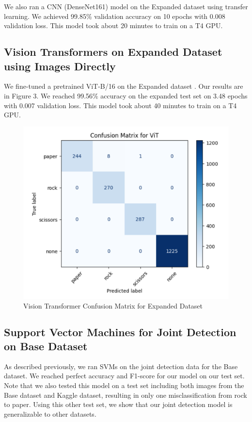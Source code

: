 \documentclass{article}
\begin{document}
We also ran a CNN (DenseNet161) model on the Expanded dataset using transfer learning. We achieved 99.85\% validation accuracy on 10 epochs with 0.008 validation loss. This model took about 20 minutes to train on a T4 GPU.

\subsection{Vision Transformers on Expanded Dataset using Images Directly}

We fine-tuned a pretrained ViT-B/16 on the Expanded dataset \cite{vit}. Our results are in Figure 3. We reached 99.56\% accuracy on the expanded test set on 3.48 epochs with 0.007 validation loss. This model took about 40 minutes to train on a T4 GPU.

\begin{figure}[h]
\begin{center}
\centerline{\includegraphics[width=\columnwidth]{vision_confus.png}}
\caption{Vision Transformer Confusion Matrix for Expanded Dataset}
\end{center}
\vskip -0.1in
\end{figure}

\subsection{Support Vector Machines for Joint Detection on Base Dataset}
As described previously, we ran SVMs on the joint detection data for the Base dataset. We reached perfect accuracy and F1-score for our model on our test set. Note that we also tested this model on a test set including both images from the Base dataset and Kaggle dataset, resulting in only one misclassification from rock to paper. Using this other test set, we show that our joint detection model is generalizable to other datasets.
\end{document}
